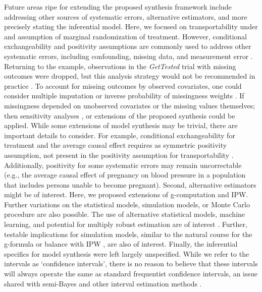 \documentclass[]{article}
\begin{document}
Future areas ripe for extending the proposed synthesis framework include addressing other sources of systematic errors, alternative estimators, and more precisely stating the inferential model. Here, we focused on transportability under and assumption of marginal randomization of treatment. However, conditional exchangeability and positivity assumptions are commonly used to address other systematic errors, including confounding, missing data, and measurement error \cite{zivich_positivity_2022}. Returning to the example, observations in the \textit{GetTested} trial with missing outcomes were dropped, but this analysis strategy would not be recommended in practice \cite{ware_missing_2012}. To account for missing outcomes by observed covariates, one could consider multiple imputation or inverse probability of missingness weights \cite{perkins_principled_2018}. If missingness depended on unobserved covariates or the missing values themselves; then sensitivity analyses \cite{robins_sensitivity_2000, greenland_basic_1996}, or extensions of the proposed synthesis could be applied. While some extensions of model synthesis may be trivial, there are important details to consider. For example, conditional exchangeability for treatment and the average causal effect requires as symmetric positivity assumption, not present in the positivity assumption for transportability \cite{zivich_positivity_2022, zivich_use_2022}. Additionally, positivity for some systematic errors may remain uncorrectable (e.g., the average causal effect of pregnancy on blood pressure in a population that includes persons unable to become pregnant). Second, alternative estimators might be of interest. Here, we proposed extensions of g-computation and IPW. Further variations on the statistical models, simulation models, or Monte Carlo procedure are also possible. The use of alternative statistical models, machine learning, and potential for multiply robust estimation are of interest \cite{bang_doubly_2005, zivich_machine_2021}. Further, testable implications for simulation models, similar to the natural course for the g-formula \cite{keil_parametric_2014} or balance with IPW \cite{austin_moving_2015}, are also of interest. Finally, the inferential specifics for model synthesis were left largely unspecified. While we refer to the intervals as `confidence intervals', there is no reason to believe that these intervals will always operate the same as standard frequentist confidence intervals, an issue shared with semi-Bayes and other interval estimation methods \cite{greenland_interval_2004, greenland_bayesian_2006}.
\end{document}
